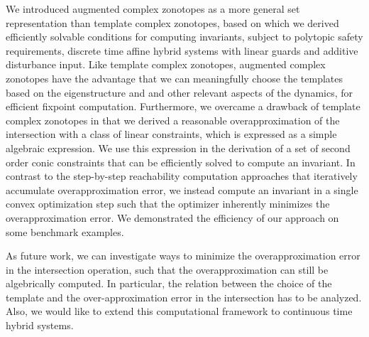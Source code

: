We introduced augmented complex zonotopes as a more general set
representation than template complex zonotopes, based on which we
derived efficiently solvable conditions for computing invariants,
subject to polytopic safety requirements, discrete time affine hybrid
systems with linear guards and additive disturbance input.  Like
template complex zonotopes, augmented complex zonotopes have the
advantage that we can meaningfully choose the templates based on the
eigenstructure and and other relevant aspects of the dynamics, for
efficient fixpoint computation.  Furthermore, we overcame a drawback
of template complex zonotopes in that we derived a reasonable
overapproximation of the intersection with a class of linear
constraints, which is expressed as a simple algebraic expression.  We
use this expression in the derivation of a set of second order conic
constraints that can be efficiently solved to compute an invariant.
In contrast to the step-by-step reachability computation approaches
that iteratively accumulate overapproximation error, we instead
compute an invariant in a single convex optimization step such that
the optimizer inherently minimizes the overapproximation error.  We
demonstrated the efficiency of our approach on some benchmark
examples.

As future work, we can investigate ways to minimize the
overapproximation error in the intersection operation, such that the
overapproximation can still be algebrically computed.  In particular,
the relation between the choice of the template and the
over-approximation error in the intersection has to be analyzed.  Also, we
would like to extend this computational framework to continuous
time hybrid systems.
